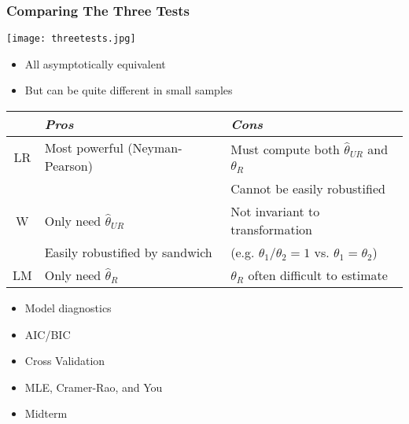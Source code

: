 \documentclass{beamer}
\begin{document}
\begin{frame}
\frametitle{Comparing The Three Tests}
\vspace{-.2in}
\begin{center}
\texttt{[image: threetests.jpg]}
\end{center}
\vspace{-.2in}
\begin{itemize}
\item All asymptotically equivalent
\item But can be quite different in small samples
\end{itemize}
\pause
{\small
\begin{tabular}{cll}
\hline\hline
   & {\it Pros}                           & {\it Cons} \\
\hline\hline
LR & Most powerful (Neyman-Pearson) & Must compute both $\hat\theta_{UR}$ and $\hat\theta_{R}$ \\
   &                                & Cannot be easily robustified \pause \\
\hline
W  & Only need $\hat\theta_{UR}$     & Not invariant to transformation \\
   & Easily robustified by sandwich & (e.g. $\theta_1/\theta_2 = 1$ vs. $\theta_1=\theta_2$) \pause \\
\hline
LM & Only need $\hat\theta_{R}$      & $\hat\theta_{R}$ often difficult to estimate \\
\hline\hline
\end{tabular}
}
\end{frame}


\begin{frame}

\huge

\begin{itemize}
\item Model diagnostics
\item AIC/BIC
\item Cross Validation
\item MLE, Cramer-Rao, and You
\item Midterm
\end{itemize}

\end{frame}
\end{document}
